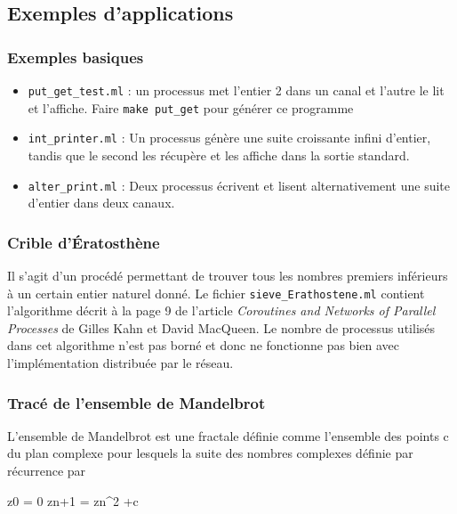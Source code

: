 \documentclass[]{scrartcl}
\begin{document}
\subsection{Exemples d'applications}\label{exemples-dapplications}

\subsubsection{Exemples basiques}\label{exemples-basiques}

\begin{itemize}
\itemsep1pt\parskip0pt
\item
  \lstinline!put_get_test.ml! : un processus met l'entier 2 dans un
  canal et l'autre le lit et l'affiche. Faire \lstinline!make put_get!
  pour générer ce programme
\item
  \lstinline!int_printer.ml! : Un processus génère une suite croissante
  infini d'entier, tandis que le second les récupère et les affiche dans
  la sortie standard.
\item
  \lstinline!alter_print.ml! : Deux processus écrivent et lisent
  alternativement une suite d'entier dans deux canaux.
\end{itemize}

\subsubsection{Crible d'Ératosthène}\label{crible-duxe9ratosthuxe8ne}

Il s'agit d'un procédé permettant de trouver tous les nombres premiers
inférieurs à un certain entier naturel donné. Le fichier
\lstinline!sieve_Erathostene.ml! contient l'algorithme décrit à la page
9 de l'article \emph{Coroutines and Networks of Parallel Processes} de
Gilles Kahn et David MacQueen. Le nombre de processus utilisés dans cet
algorithme n'est pas borné et donc ne fonctionne pas bien avec
l'implémentation distribuée par le réseau.

\subsubsection{Tracé de l'ensemble de
Mandelbrot}\label{tracuxe9-de-lensemble-de-mandelbrot}

L'ensemble de Mandelbrot est une fractale définie comme l'ensemble des
points c du plan complexe pour lesquels la suite des nombres complexes
définie par récurrence par

z0 = 0 zn+1 = zn\^{}2 +c
\end{document}
